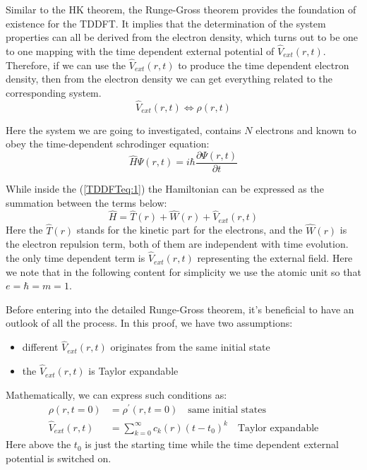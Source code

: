 Similar to the HK theorem, the Runge-Gross theorem provides the
foundation of existence for the TDDFT. It implies that the
determination of the system properties can all be derived from the
electron density, which turns out to be one to one mapping with the
time dependent external potential of $\hat{V}_{ext}(r,t)$.
Therefore, if we can use the $\hat{V}_{ext}(r,t)$ to produce the
time dependent electron density, then from the electron density we
can get everything related to the corresponding system.
\begin{equation}\label{}
\hat{V}_{ext}(r,t) \Leftrightarrow \rho(r,t)
\end{equation}

Here the system we are going to investigated, contains $N$ electrons
and known to obey the time-dependent schrodinger equation:
\begin{equation}\label{TDDFTeq:1}
\hat{H}\Psi(r,t) = i \hbar \frac{\partial \Psi(r,t)}{\partial t}
\end{equation}

While inside the (\ref{TDDFTeq:1}) the Hamiltonian can be expressed
as the summation between the terms below:
\begin{equation}\label{}
\hat{H} = \hat{T}(r) + \hat{W}(r) + \hat{V}_{ext}(r,t)
\end{equation}
Here the $\hat{T}(r)$ stands for the kinetic part for the electrons,
and the $\hat{W}(r)$ is the electron repulsion term, both of them
are independent with time evolution. the only time dependent term is
$\hat{V}_{ext}(r,t)$ representing the external field. Here we note
that in the following content for simplicity we use the atomic unit
so that $e=\hbar=m=1$.

Before entering into the detailed Runge-Gross theorem, it's
beneficial to have an outlook of all the process. In this proof, we
have two assumptions:
\begin{itemize}
  \item different $\hat{V}_{ext}(r,t)$ originates from the same
  initial state
  \item the $\hat{V}_{ext}(r,t)$ is Taylor expandable
\end{itemize}

Mathematically, we can express such conditions as:
\begin{align}\label{}
\rho(r, t=0) &= \rho^{'}(r, t=0) \quad \text{same initial states} 
\nonumber \\
\hat{V}_{ext}(r,t) &= \sum_{k=0}^{\infty}c_{k}(r)(t-t_{0})^{k} \quad
\text{Taylor expandable}
\end{align}
Here above the $t_{0}$ is just the starting time while the time
dependent external potential is switched on. 

